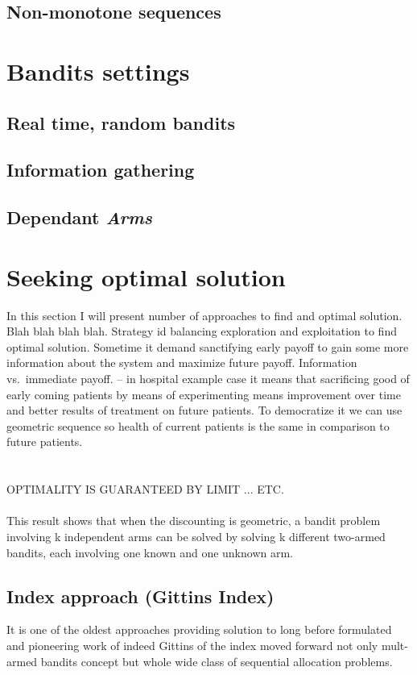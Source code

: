 \documentclass[12pt, a4paper, pdflatex]{report}
\begin{document}
\subsection{Non-monotone sequences}



\section{Bandits settings}
\subsection{Real time, random bandits}
\subsection{Information gathering}
\subsection{Dependant \emph{Arms}}



\section{Seeking optimal solution}
In this section I will present number of approaches to find and optimal solution.\\
Blah blah blah blah.
Strategy id balancing exploration and exploitation to find optimal solution. Sometime it demand sanctifying early payoff to gain some more information about the system and maximize future payoff.
Information vs.\ immediate payoff. -- in hospital example case it means that sacrificing good of early coming patients by means of experimenting means improvement over time and better results of treatment on future patients.
To democratize it we can use geometric sequence so health of current patients is the same in comparison to future patients.\\
\\
\\
OPTIMALITY IS GUARANTEED BY LIMIT ... ETC.
\\
\\
This result shows that when the discounting is geometric, a bandit problem involving k independent arms can be solved by solving k different two-armed bandits, each involving one known and one unknown arm.\\

\subsection{Index approach (Gittins Index)}
It is one of the oldest approaches providing solution to long before formulated and pioneering work of indeed Gittins of the index moved forward not only mult-armed bandits concept but whole wide class of sequential allocation problems.\\
\end{document}
